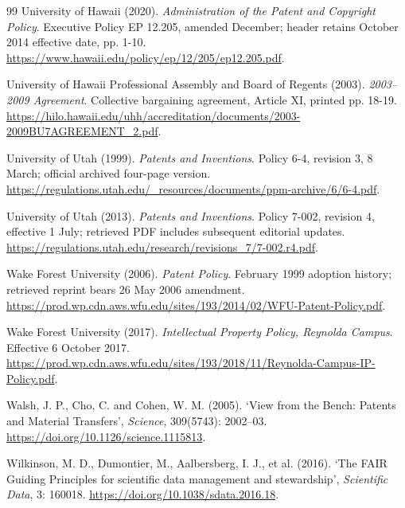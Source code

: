 \begin{thebibliography}{99}
 University of Hawaii (2020). \emph{Administration of the Patent and Copyright Policy}. Executive Policy EP 12.205, amended December; header retains October 2014 effective date, pp. 1-10. \url{https://www.hawaii.edu/policy/ep/12/205/ep12.205.pdf}.

 University of Hawaii Professional Assembly and Board of Regents (2003). \emph{2003--2009 Agreement}. Collective bargaining agreement, Article XI, printed pp. 18-19. \url{https://hilo.hawaii.edu/uhh/accreditation/documents/2003-2009BU7AGREEMENT_2.pdf}.

 University of Utah (1999). \emph{Patents and Inventions}. Policy 6-4, revision 3, 8 March; official archived four-page version. \url{https://regulations.utah.edu/_resources/documents/ppm-archive/6/6-4.pdf}.

 University of Utah (2013). \emph{Patents and Inventions}. Policy 7-002, revision 4, effective 1 July; retrieved PDF includes subsequent editorial updates. \url{https://regulations.utah.edu/research/revisions_7/7-002.r4.pdf}.

 Wake Forest University (2006). \emph{Patent Policy}. February 1999 adoption history; retrieved reprint bears 26 May 2006 amendment. \url{https://prod.wp.cdn.aws.wfu.edu/sites/193/2014/02/WFU-Patent-Policy.pdf}.

 Wake Forest University (2017). \emph{Intellectual Property Policy, Reynolda Campus}. Effective 6 October 2017. \url{https://prod.wp.cdn.aws.wfu.edu/sites/193/2018/11/Reynolda-Campus-IP-Policy.pdf}.

 Walsh, J. P., Cho, C. and Cohen, W. M. (2005). `View from the Bench: Patents and Material Transfers', \emph{Science}, 309(5743): 2002--03. \url{https://doi.org/10.1126/science.1115813}.

 Wilkinson, M. D., Dumontier, M., Aalbersberg, I. J., et al. (2016). `The FAIR Guiding Principles for scientific data management and stewardship', \emph{Scientific Data}, 3: 160018. \url{https://doi.org/10.1038/sdata.2016.18}.
\end{thebibliography}
